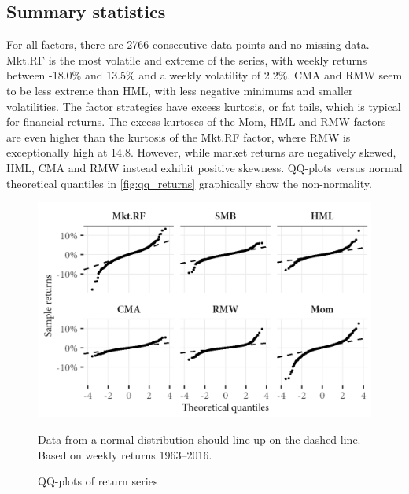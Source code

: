 \subsection{Summary statistics}



For all factors, there are \num{2766} consecutive data points and no missing data. Mkt.RF is the most volatile and extreme of the series, with weekly returns between -18.0\% and 13.5\% and a weekly volatility of 2.2\%. CMA and RMW seem to be less extreme than HML, with less negative minimums and smaller volatilities. The factor strategies have excess kurtosis, or fat tails, which is typical for financial returns. The excess kurtoses of the Mom, HML and RMW factors are even higher than the kurtosis of the Mkt.RF factor, where RMW is exceptionally high at 14.8. However, while market returns are negatively skewed, HML, CMA and RMW instead exhibit positive skewness. QQ-plots versus normal theoretical quantiles in \autoref{fig:qq_returns} graphically show the non-normality.

\begin{figure}[ht!]
  \centering
  \footnotesize
  \includegraphics[scale=1]{graphics/qq_returns.png}
  \caption{QQ-plots of return series}
  \begin{longcaption}
    Data from a normal distribution should line up on the dashed line. Based on weekly returns 1963--2016.
  \end{longcaption}
  \label{fig:qq_returns}
\end{figure}

